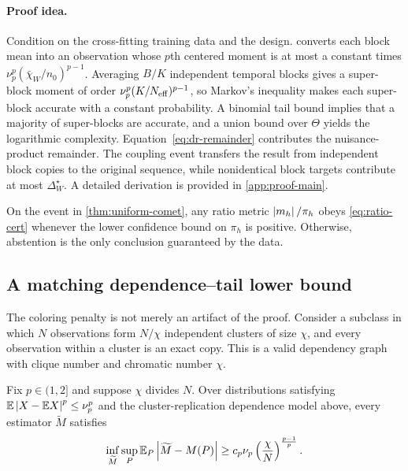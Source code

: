 \paragraph{Proof idea.}
Condition on the cross-fitting training data and the design.  converts each block mean into an observation whose $p$th centered moment is at most a constant times $\nu_p^p(\bar\chi_W/n_0)^{p-1}$. Averaging $B/K$ independent temporal blocks gives a super-block moment of order $\nu_p^p(K/N_{\mathrm{eff}})^{p-1}$, so Markov's inequality makes each super-block accurate with a constant probability. A binomial tail bound implies that a majority of super-blocks are accurate, and a union bound over $\Theta$ yields the logarithmic complexity. Equation~\eqref{eq:dr-remainder} contributes the nuisance-product remainder. The coupling event transfers the result from independent block copies to the original sequence, while nonidentical block targets contribute at most $\Delta_W^{\star}$. A detailed derivation is provided in \cref{app:proof-main}.

\begin{corollary}
\label{cor:ratio}
On the event in \cref{thm:uniform-comet}, any ratio metric $\left|m_h\right|/\pi_h$ obeys \cref{eq:ratio-cert} whenever the lower confidence bound on $\pi_h$ is positive. Otherwise, abstention is the only conclusion guaranteed by the data.
\end{corollary}

\subsection{A matching dependence--tail lower bound}
The coloring penalty is not merely an artifact of the proof. Consider a subclass in which $N$ observations form $N/\chi$ independent clusters of size $\chi$, and every observation within a cluster is an exact copy. This is a valid dependency graph with clique number and chromatic number $\chi$.

\begin{theorem}
\label{thm:lower}
Fix $p\in(1,2]$ and suppose $\chi$ divides $N$. Over distributions satisfying $\mathbb{E}\left|X-\mathbb{E} X\right|^p\le\nu_p^p$ and the cluster-replication dependence model above, every estimator $\widetilde M$ satisfies
\begin{equation}
\inf_{\widetilde M}\sup_{P}
\mathbb{E}_P\left|\widetilde M-M(P)\right|
\ge c_p\nu_p
\left(\frac{\chi}{N}\right)^{\frac{p-1}{p}}.
\label{eq:lower-bound}
\end{equation}
\end{theorem}

